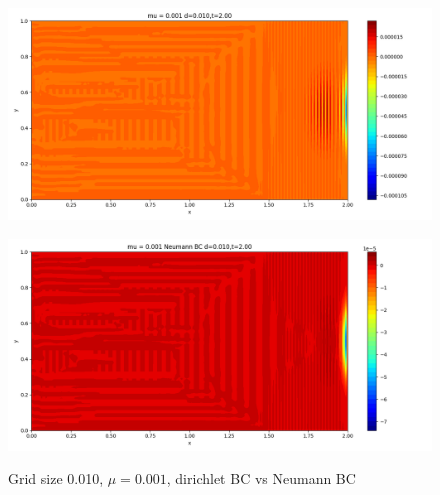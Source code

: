 \documentclass[12pt]{article}
\begin{document}
\begin{figure}[H]
\begin{minipage}{\linewidth}
\begin{minipage}{0.5\textwidth}
\includegraphics[width=\linewidth]{figuresmu/mu3d0.010t2.00.png}
\label{fig7}
\end{minipage}\hfill
\begin{minipage}{0.5\textwidth}
\includegraphics[width=\linewidth]{figuresmu/mu3Nud0.010t2.00.png}
\label{fig8}
\end{minipage}
\caption{Grid size 0.010, $\mu = 0.001$, dirichlet BC vs Neumann BC}

\end{minipage}
\end{figure}
\end{document}
